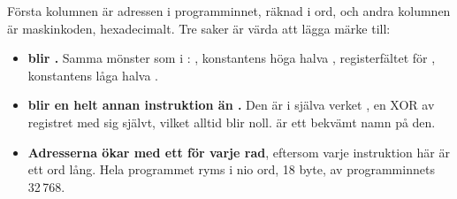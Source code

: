 Första kolumnen är adressen i programminnet, räknad i ord, och andra kolumnen är maskinkoden,
hexadecimalt. Tre saker är värda att lägga märke till:
\begin{itemize}
  \item \textbf{ blir .} Samma mönster som i :
    , konstantens höga halva , registerfältet  för ,
    konstantens låga halva .
  \item \textbf{ blir en helt annan instruktion än .} Den är i
    själva verket , en XOR av registret med sig självt, vilket alltid blir noll.
     är ett bekvämt namn på den.
  \item \textbf{Adresserna ökar med ett för varje rad}, eftersom varje instruktion här är ett ord
    lång. Hela programmet ryms i nio ord, 18 byte, av programminnets 32\,768.
\end{itemize}
